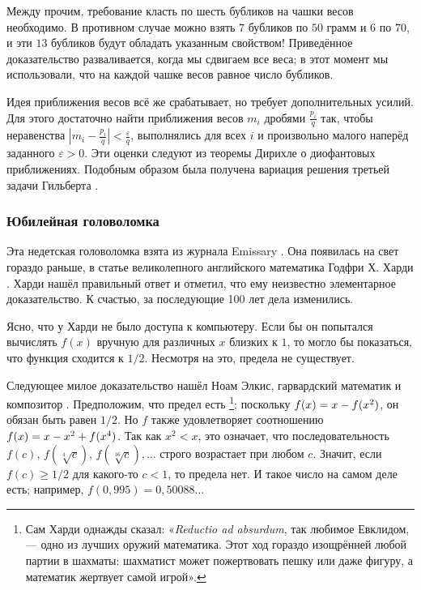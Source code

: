 Между прочим, требование класть по шесть бубликов на чашки весов необходимо.
В противном случае можно взять $7$ бубликов по $50$ грамм и $6$ по $70$, и эти $13$ бубликов будут обладать указанным свойством!
Приведённое доказательство разваливается, когда мы сдвигаем все веса;
в этот момент мы использовали, что на каждой чашке весов равное число бубликов.

\begin{addedbytheeditors}
Идея приближения весов всё же срабатывает, но требует дополнительных усилий.
Для этого достаточно найти приближения весов $m_i$ дробями $\tfrac{p_i}q$ так, чтобы неравенства
$|m_i-\tfrac{p_i}q|<\tfrac\varepsilon q$,
выполнялись для всех $i$ и произвольно малого наперёд заданного $\varepsilon>0$.
Эти оценки следуют из теоремы Дирихле о диофантовых приближениях.
Подобным образом была получена вариация решения третьей задачи Гильберта \cite{benko}. 
\pr
\end{addedbytheeditors}


\subsubsection*{Юбилейная головоломка}

Эта недетская головоломка взята из журнала Emissary \cite[Осень 2004]{3}.
Она появилась на свет гораздо раньше, в статье великолепного английского математика Годфри Х. Харди \cite{37}. 
Харди нашёл правильный ответ и отметил, что ему неизвестно элементарное доказательство.
К счастью, за последующие 100 лет дела изменились.

Ясно, что у Харди не было доступа к компьютеру.
Если бы он попытался вычислять $f(x)$ вручную для различных $x$ близких к $1$, то могло бы показаться, что функция сходится к $1/2$.
Несмотря на это, предела не существует.

Следующее милое доказательство нашёл Ноам Элкис, гарвардский математик и композитор \cite[Problem 8]{elkies}.
Предположим, что предел есть%
\footnote{Сам Харди однажды сказал: «\emph{Reductio ad absurdum}, так любимое Евклидом, --- одно из лучших оружий математика.
Этот ход гораздо изощрённей любой партии в шахматы:
шахматист может пожертвовать пешку или даже фигуру, а математик жертвует самой игрой».};
поскольку $f(x)\z=x\z-f(x^2)$, он обязан быть равен $1/2$.
Но $f$ также удовлетворяет соотношению $f(x)\z=x\z-x^2\z+f(x^4)$.
Так как $x^2 < x$, это означает, что последовательность $f(c)$, $f(\sqrt[4]{c})$, $f(\sqrt[16]{c}),\dots$ строго возрастает при любом $c$.
Значит, если $f(c)\ge1/2$ для какого-то $c<1$, то предела нет.
И такое число на самом деле есть; например, $f(0{,}995)=0{,}50088\dots$

